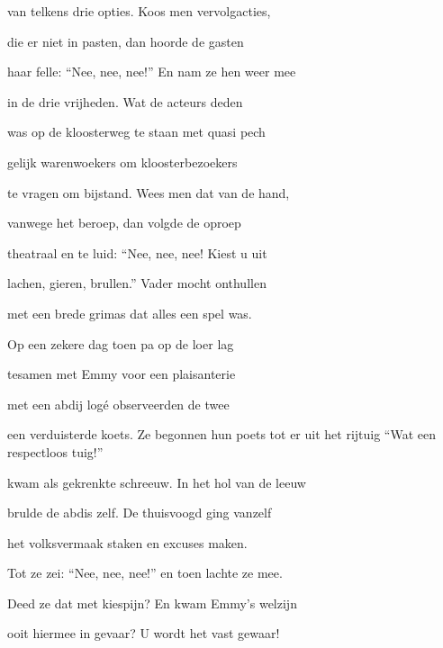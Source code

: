 van telkens drie opties.
Koos men vervolgacties,

die er niet in pasten,
dan hoorde de gasten

haar felle: “Nee, nee, nee!”
En nam ze hen weer mee

in de drie vrijheden.
Wat de acteurs deden

was op de kloosterweg
te staan met quasi pech

gelijk warenwoekers
om kloosterbezoekers

te vragen om bijstand.
Wees men dat van de hand,

vanwege het beroep,
dan volgde de oproep

theatraal en te luid:
“Nee, nee, nee! Kiest u uit

lachen, gieren, brullen.”
Vader mocht onthullen

met een brede grimas
dat alles een spel was.

Op een zekere dag
toen pa op de loer lag

tesamen met Emmy
voor een plaisanterie

met een abdij logé
observeerden de twee

een verduisterde koets.
Ze begonnen hun poets
tot er uit het rijtuig
“Wat een respectloos tuig!”

kwam als gekrenkte schreeuw.
In het hol van de leeuw

brulde de abdis zelf.
De thuisvoogd ging vanzelf

het volksvermaak staken
en excuses maken.

Tot ze zei: “Nee, nee, nee!”
en toen lachte ze mee.

Deed ze dat met kiespijn?
En kwam Emmy’s welzijn

ooit hiermee in gevaar?
U wordt het vast gewaar!
